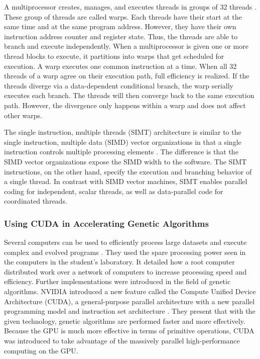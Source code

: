 \documentclass{acm_proc_article-sp}
\begin{document}
A multiprocessor creates, manages, and executes threads in groups of 32
threads \cite{pdf:NVCudaPrgGuide}. 
These group of threads are called warps. Each threads have their start at the same 
time and at the same program address. However, they have their own instruction address 
counter and register state. Thus, the threads are able to branch and execute independently.
When a multiprocessor is given one or more thread blocks to execute, it partitions into warps 
that get scheduled for execution. A warp executes one common instruction at a time. When
all 32 threads of a warp agree on their execution path, full efficiency is realized. If the threads
diverge via a data-dependent conditional branch, the warp serially executes each branch.
The threads will then converge back to the same execution path.  However, the divergence only
happens within a warp and does not affect other warps.

The single instruction, multiple threads (SIMT) architecture is similar to the single instruction,
multiple data (SIMD) vector organizations in that a single instruction controls multiple processing
elements \cite{pdf:NVCudaPrgGuide}. The difference is that the SIMD vector
organizations expose the SIMD width to the software. The SIMT instructions, on
the other hand, specify the execution and branching behavior of a single thread.
In contrast with SIMD vector machines, SIMT enables parallel coding for
independent, scalar threads, as well as data-parallel code for 
coordinated threads. 

\subsubsection{Using CUDA in Accelerating Genetic Algorithms}
Several computers can be used to efficiently process large datasets and execute complex
and evolved programs \cite{Harding09}. They used the spare processing power seen in the
computers in the student's laboratory. It detailed how a root computer distributed work
over a network of computers to increase processing speed and efficiency. Further
implementations were introduced in the field of genetic algorithms. NVIDIA introduced a new 
feature called the Compute Unified Device Architecture (CUDA),
a general-purpose parallel architecture with a new parallel programming model and instruction
set architecture \cite{Zhang09}. They present that with the given technology, genetic algorithms
are performed faster and more effectively. Because the GPU is much more effective in terms of primitive
operations, CUDA was introduced to take advantage of the massively parallel high-performance
computing on the GPU.  
\end{document}
